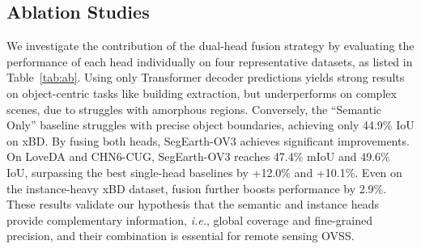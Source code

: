 \documentclass[twocolumn,switch,times]{article}
\newcommand{\samov}{SegEarth-OV\textcolor{cvprpink}{3}\xspace}
\begin{document}
    


\subsection{Ablation Studies}

We investigate the contribution of the dual-head fusion strategy by evaluating the performance of each head individually on four representative datasets, as listed in Table~\ref{tab:ab}. Using only Transformer decoder predictions yields strong results on object-centric tasks like building extraction, but underperforms on complex scenes, due to struggles with amorphous regions. Conversely, the ``Semantic Only'' baseline struggles with precise object boundaries, achieving only 44.9\% IoU on xBD. By fusing both heads, \samov achieves significant improvements. On LoveDA and CHN6-CUG, \samov reaches 47.4\% mIoU and 49.6\% IoU, surpassing the best single-head baselines by +12.0\% and +10.1\%. Even on the instance-heavy xBD dataset, fusion further boosts performance by 2.9\%. These results validate our hypothesis that the semantic and instance heads provide complementary information, \textit{i.e.}, global coverage and fine-grained precision, and their combination is essential for remote sensing OVSS.
\end{document}
